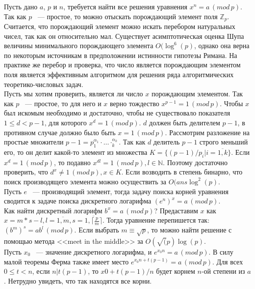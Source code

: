 Пусть дано $a$, $p$ и $n$, требуется найти все
решения уравнения $x^n = a\,(mod \, p)$.
Так как $p$ ~--- простое, то можно отыскать
порождающий элемент поля $\mathbb{Z}_p$.
Считается, что порождающий элемент можно искать
перебором натуральных чисел, так как он относительно мал.
Существует асимптотическая оценка Шупа величины минимального
порождающего элемента $O(\log^6(p)$, однако она верна по некоторым
источникам в предположении истинности гипотезы Римана.
На практике же перебор и проверка, что число является
порождающим элементом поля является эффективным алгоритмом
для решения ряда алгоритмических теоретико-числовых задач.\\

Пусть мы хотим проверить, является ли число $x$
порождающим элементом. Так как $p$ ~--- простое,
то для него и $x$ верно тождество $x^{p-1} = 1\,(mod \,p)$.
Чтобы $x$ был искомым необходимо и достаточно, чтобы
не существовало показателя $1 \le d < p - 1$, для которого
$x^d = 1\,(mod \,p)$. $d$ должен быть делителем $p-1$,
в противном случае должно было быть $x=1\,(mod \,p)$.
Рассмотрим разложение на простые множители
$p-1=p_1^{\alpha_1}\cdot \ldots \cdotp_k^{\alpha_k}$.
Так как $d$ делитель $p-1$ строго меньший его, то
он делит какой-то элемент из множества $K = \{(p-1)/p_i|i=\overline{1,k}\}$.
Если $x^d=1\,(mod \,p)$, то подавно $x^{dl}=1\,(mod\,p), l\in\mathbb{N}$.
Поэтому достаточно проверить, что $d^x \neq 1\,(mod \,p), x \in K$.
Если возводить в степень бинарно, что поиск производящего
элемента можно осуществить за $O(ans\log^2(p)$.\\

Пусть $e$ ~--- производящий элемент, тогда
задачу поиска корней уравнения сводится к задаче поиска дискретного
логарифма $(e^n)^x = a\,(mod \,p)$.\\

Как найти дискретный логарифм $b^x=a\,(mod \, p)$?
Предаставим $x$ как
$x = m * s - l, l = \overline{1,m}, s = \overline{1,\lceil \frac{p}{m} \rceil}$.
Тогда уравнение перепишется так:
$(b^m)^s = ab^l\,(mod \, p)$. Если выбрать $m \equiv \sqrt{p}$, то
можно найти решение с помощью метода <<meet in the middle>> за
$O(\sqrt(p)\log(p)$.\\

Пусть $x_0$ ~--- значение дискретного логарифма, и
$e^{x_0n}=a\,(mod \,p)$. В силу малой теоремы
Ферма также имеет место $e^{x_0n+t(p-1)}=a\,(mod \,p)$.
Для всех $0 \le t < n$, если $n | t(p-1)$, то $x0+t(p-1)/n$
будет корнем $n$-ой степени из $a$. Нетрудно увидеть, что так
находятся все корни.
